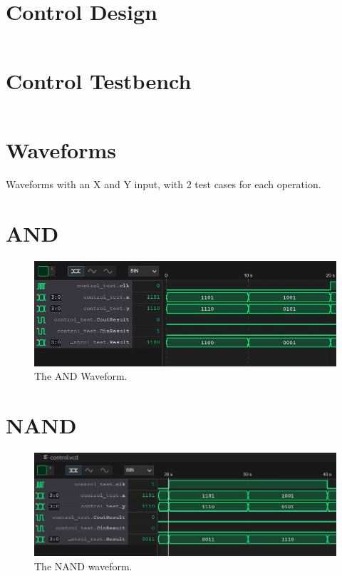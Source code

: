 \documentclass[
	letterpaper, %
	10pt, %
]{CSUniSchoolLabReport}
\begin{document}
\section{Control Design}
\begin{center}
    \inputminted{octave}{verilog/control/control.v}
\end{center}
\section{Control Testbench}
\begin{center}
    \inputminted{octave}{verilog/control/control_test.v}
\end{center}

\section{Waveforms}
Waveforms with an X and Y input, with 2 test cases for each operation.

    

\section{AND}
\begin{figure}[H] %
    \includegraphics[width=\textwidth]{figures/and.JPG} %
    \caption{The AND Waveform.}
\end{figure}
\section{NAND}
\begin{figure}[H] %
    \includegraphics[width=\textwidth]{figures/nand.JPG} %
    \caption{The NAND waveform.}
\end{figure}
\end{document}
